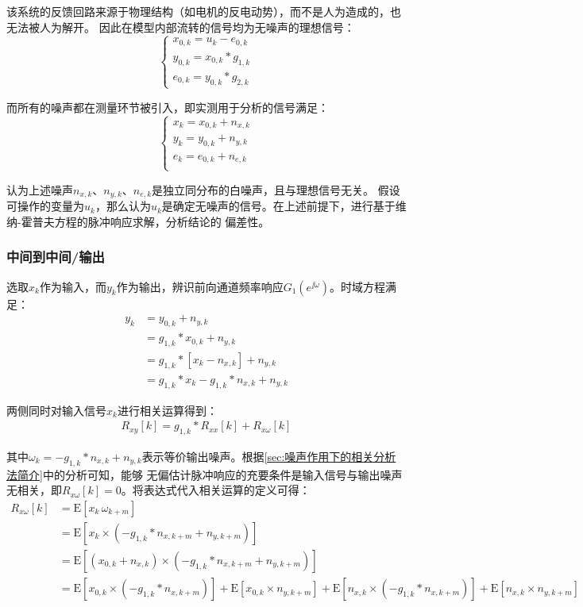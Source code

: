 该系统的反馈回路来源于物理结构（如电机的反电动势），而不是人为造成的，也无法被人为解开。
因此在模型内部流转的信号均为无噪声的理想信号：
\begin{equation*}
    \begin{cases}
    x_{0,k}=u_k-e_{0,k}\\
    y_{0,k}=x_{0,k}*g_{1,k}\\
    e_{0,k}=y_{0,k}*g_{2,k}
    \end{cases}
\end{equation*}

而所有的噪声都在测量环节被引入，即实测用于分析的信号满足：
\begin{equation*}
    \begin{cases}
        x_k=x_{0,k}+n_{x,k}\\
        y_k=y_{0,k}+n_{y,k}\\
        e_k=e_{0,k}+n_{e,k}\\
    \end{cases}
\end{equation*}

认为上述噪声\(n_{x,k}\)、\(n_{y,k}\)、\(n_{e,k}\)是独立同分布的白噪声，且与理想信号无关。
假设可操作的变量为\(u_k\)，那么认为\(u_k\)是确定无噪声的信号。在上述前提下，进行基于维纳-霍普夫方程的脉冲响应求解，分析结论的
偏差性。

\subsubsection{中间到中间/输出\label{sec:中间到中间/输出的偏倚性分析}}
选取\(x_k\)作为输入，而\(y_k\)作为输出，辨识前向通道频率响应\(G_1(e^{\jj\omega})\)。时域方程满足：
\begin{align*}
    y_k&=y_{0,k}+n_{y,k}\\
    &=g_{1,k}*x_{0,k}+n_{y,k}\\
    &=g_{1,k}*[x_k-n_{x,k}]+n_{y,k}\\
    &=g_{1,k}*x_k-g_{1,k}*n_{x,k}+n_{y,k}
\end{align*}

两侧同时对输入信号\(x_k\)进行相关运算得到：
\begin{align*}
    R_{xy}[k] = g_{1,k}*R_{xx}[k]+R_{x\omega}[k]
\end{align*}

其中\(\omega_k = -g_{1,k}*n_{x,k}+n_{y,k}\)表示等价输出噪声。根据\ref{sec:噪声作用下的相关分析法简介}中的分析可知，能够
无偏估计脉冲响应的充要条件是输入信号与输出噪声无相关，即\(R_{x\omega}[k]=0\)。将表达式代入相关运算的定义可得：
\begin{align*}
    R_{x\omega}[k] &= \text{E}[x_k\,\omega_{k+m}]\\
    &= \text{E}[x_k\times(-g_{1,k}*n_{x,k+m}+n_{y,k+m})]\\
    &= \text{E}[(x_{0,k}+n_{x,k})\times(-g_{1,k}*n_{x,k+m}+n_{y,k+m})]\\
    &= \text{E}[x_{0,k}\times(-g_{1,k}*n_{x,k+m})]+\text{E}[x_{0,k}\times n_{y,k+m}]
    + \text{E}[n_{x,k}\times(-g_{1,k}*n_{x,k+m})]+\text{E}[n_{x,k}\times n_{y,k+m}]
\end{align*}

